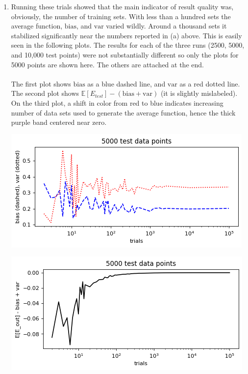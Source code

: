 \documentclass[12pt]{article}
\newcommand{\Expect}{\mathbb{E}}
\newcommand{\Bias}{\bm{\mathrm{bias}}}
\newcommand{\Var}{\bm{\mathrm{var}}}
\begin{document}
\begin{enumerate}
\begin{enumerate}
        \item Running these trials showed that the main indicator of result quality was, obviously, the number of training sets.  With less than a hundred sets the average function, $\Bias$, and $\Var$ varied wildly.  Around a thousand sets it stabilized significantly near the numbers reported in (a) above.
        This is easily seen in the following plots.  The results for each of the three runs (2500, 5000, and 10,000 test points) were not substantially different so only the plots for 5000 points are shown here.  The others are attached at the end.
        \\\\
        The first plot shows $\Bias$ as a blue dashed line, and $\Var$ as a red dotted line.  The second plot shows $\Expect[E_{test}] - (\Bias + \Var)$ (it is slightly mislabeled).  On the third plot, a shift in color from red to blue indicates increasing number of data sets used to generate the average function, hence the thick purple band centered near zero.  
        \begin{center}\includegraphics[width=0.9\linewidth]{png/5000_data_points_bias-var.png}\end{center}
        \begin{center}\includegraphics[width=0.9\linewidth]{png/5000_data_points_diff.png}\end{center}
\pagebreak

\end{enumerate}
\end{enumerate}
\end{document}
